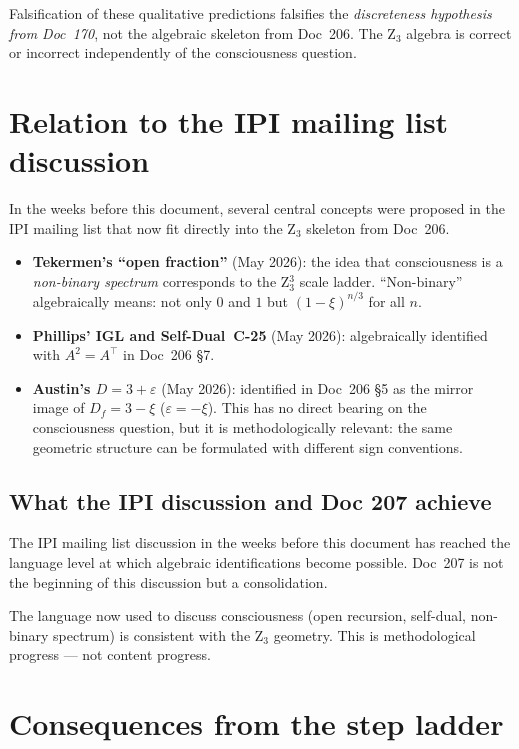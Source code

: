 \begin{interpretation}
Falsification of these qualitative predictions falsifies the \emph{discreteness hypothesis from Doc~170}, not the algebraic skeleton from Doc~206. The Z$_3$ algebra is correct or incorrect independently of the consciousness question.
\end{interpretation}

\section{Relation to the IPI mailing list discussion}\label{sec:ipi}

In the weeks before this document, several central concepts were proposed in the IPI mailing list that now fit directly into the Z$_3$ skeleton from Doc~206.

\begin{itemize}
\item \textbf{Tekermen's ``open fraction''} (May 2026): the idea that consciousness is a \emph{non-binary spectrum} corresponds to the Z$_3^3$ scale ladder. ``Non-binary'' algebraically means: not only $0$ and $1$ but $(1-\xi)^{n/3}$ for all $n$.
\item \textbf{Phillips' IGL and Self-Dual~C-25} (May 2026): algebraically identified with $A^2 = A^\top$ in Doc~206 \S7.
\item \textbf{Austin's $D = 3 + \varepsilon$} (May 2026): identified in Doc~206 \S5 as the mirror image of $D_f = 3 - \xi$ ($\varepsilon = -\xi$). This has no direct bearing on the consciousness question, but it is methodologically relevant: the same geometric structure can be formulated with different sign conventions.
\end{itemize}

\subsection{What the IPI discussion and Doc 207 achieve}

The IPI mailing list discussion in the weeks before this document has reached the language level at which algebraic identifications become possible. Doc~207 is not the beginning of this discussion but a consolidation.

The language now used to discuss consciousness (open recursion, self-dual, non-binary spectrum) is consistent with the Z$_3$ geometry. This is methodological progress --- not content progress.

\section{Consequences from the step ladder}\label{sec:consequences}

